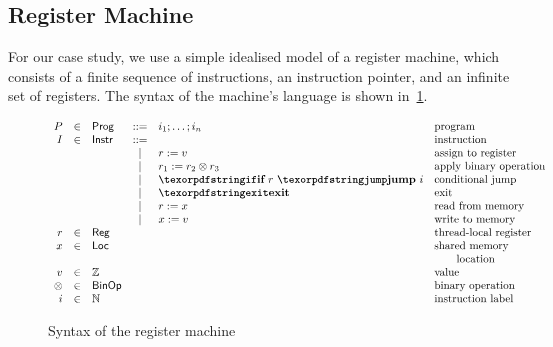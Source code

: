 \subsection{Register Machine}

For our case study, we use a simple idealised model 
of a register machine, which consists of a finite 
sequence of instructions, an instruction pointer,
and an infinite set of registers. 
The syntax of the machine's language is 
shown in~\cref{fig:regmachine-syntax}.

\begin{figure}[h!]
\[
\begin{array}{rclclll}
  P &\in& \Prog   &::=& i_1 \seq \dots \seq i_n           & \text{program}                 \\

  I &\in& \Inst     &::=&                                 & \text{instruction}             \\
              & &   & | & \assignInst{r}{v}               & \text{assign to register}      \\
              & &   & | & \opInst{\otimes}{r_1}{r_2}{r_3}  & \text{apply binary operation}  \\
              & &   & | & \jumpInst{r}{\ip{i}}            & \text{conditional jump}        \\
              & &   & | & \exitInst                       & \text{exit}                    \\
              & &   & | & \readInst{r}{x}                 & \text{read from memory}        \\
              & &   & | & \writeInst{x}{v}                & \text{write to memory}         \\

  r      &\in& \Reg     &   &                    & \text{thread-local register} \\ 
  x      &\in& \Loc     &   &                    & \text{shared memory }        \\
         &   &          &   &                    & \qquad  \text{location}      \\
  v      &\in& \Z       &   &                    & \text{value}                 \\
  \otimes&\in& \BinOp   &   &                    & \text{binary operation}      \\
  \ip{i} &\in& \N       &   &                    & \text{instruction label}     \\ 

\end{array}
\] 

\caption{Syntax of the register machine}
\label{fig:regmachine-syntax}
\end{figure}

